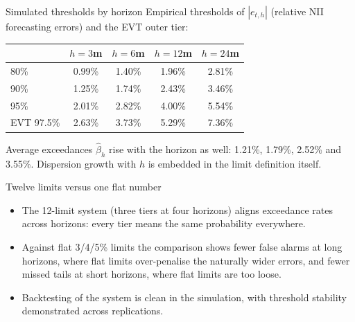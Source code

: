 \documentclass[aspectratio=169,11pt]{beamer}
\begin{document}
\begin{frame}{Simulated thresholds by horizon}
  \small Empirical thresholds of $|e_{t,h}|$ (relative NII forecasting
  errors) and the EVT outer tier:
  \begin{center}
  \begin{tabular}{lcccc}
    \toprule
    & $h=3$m & $h=6$m & $h=12$m & $h=24$m \\
    \midrule
    80\% & 0.99\% & 1.40\% & 1.96\% & 2.81\% \\
    90\% & 1.25\% & 1.74\% & 2.43\% & 3.46\% \\
    95\% & 2.01\% & 2.82\% & 4.00\% & 5.54\% \\
    EVT 97.5\% & 2.63\% & 3.73\% & 5.29\% & 7.36\% \\
    \bottomrule
  \end{tabular}
  \end{center}
  \vspace{1mm}
  Average exceedances $\hat\beta_h$ rise with the horizon as well: 1.21\%,
  1.79\%, 2.52\% and 3.55\%. Dispersion growth with $h$ is embedded in the
  limit definition itself.
\end{frame}

\begin{frame}{Twelve limits versus one flat number}
  \begin{itemize}
    \item The 12-limit system (three tiers at four horizons) aligns
          exceedance rates across horizons: every tier means the same
          probability everywhere.
    \item Against flat 3/4/5\% limits the comparison shows fewer false
          alarms at long horizons, where flat limits over-penalise the
          naturally wider errors, and fewer missed tails at short horizons,
          where flat limits are too loose.
    \item Backtesting of the system is clean in the simulation, with
          threshold stability demonstrated across replications.
  \end{itemize}
\end{frame}
\end{document}
